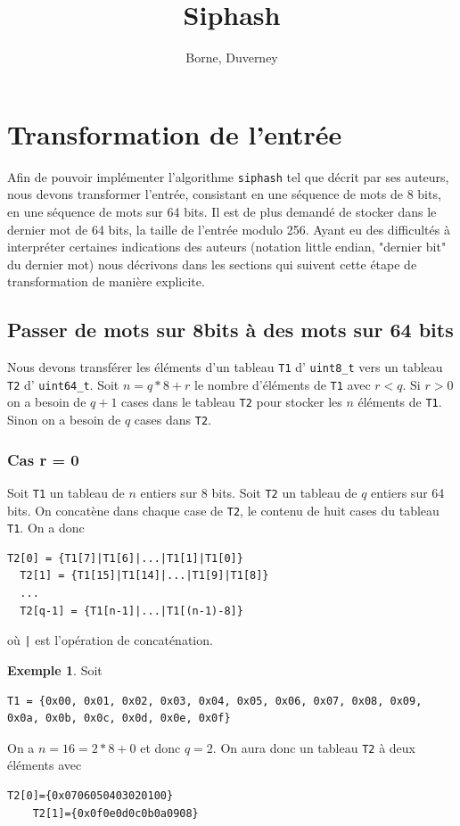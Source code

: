 \documentclass[11pt]{article}
\author{Borne, Duverney}
\date{}
\title{Siphash}
\theoremstyle{definition}
\theoremstyle{definition}
\theoremstyle{definition}
\newtheorem*{myex}{Exemple}
\theoremstyle{theorem}
\theoremstyle{definition}
\begin{document}
\maketitle

\section{Transformation de l'entrée}
Afin de pouvoir implémenter l'algorithme \texttt{siphash} tel que décrit par ses auteurs,
nous devons transformer l'entrée, consistant en une séquence de mots de 8 bits, en une séquence de
mots sur 64 bits. Il est de plus demandé de stocker dans le dernier mot de 64 bits, la taille de l'entrée
modulo 256. Ayant eu des difficultés à interpréter certaines indications des auteurs (notation little endian, "dernier bit" du dernier mot) nous décrivons dans les sections qui suivent cette étape de transformation de manière explicite. 
\subsection{Passer de mots sur 8bits à des mots sur 64 bits}

Nous devons transférer les éléments d'un tableau \texttt{T1} d' \texttt{uint8\_t} vers un tableau \texttt{T2} d' \texttt{uint64\_t}. Soit $n = q*8 + r$ le nombre d'éléments de \texttt{T1} avec $r<q$.
Si $r > 0$ on a besoin de $q+1$ cases dans le tableau \texttt{T2} pour stocker les $n$ éléments de \texttt{T1}.
Sinon on a besoin de $q$ cases dans \texttt{T2}.
\subsubsection{Cas r = 0}
Soit \texttt{T1} un tableau de $n$ entiers sur 8 bits.
Soit \texttt{T2} un tableau de $q$ entiers sur 64 bits.
On concatène dans chaque case de \texttt{T2}, le contenu de huit cases du tableau \texttt{T1}. On a donc
\begin{lstlisting}[basicstyle={\scriptsize\ttfamily}, columns={fixed}, frame={}]
  T2[0] = {T1[7]|T1[6]|...|T1[1]|T1[0]}
  T2[1] = {T1[15]|T1[14]|...|T1[9]|T1[8]}
  ...
  T2[q-1] = {T1[n-1]|...|T1[(n-1)-8]} 
\end{lstlisting}
où \texttt{|} est l'opération de concaténation.
\begin{myex}
  Soit
  \begin{lstlisting}[basicstyle={\scriptsize\ttfamily}, columns={fixed}, frame={}]
    T1 = {0x00, 0x01, 0x02, 0x03, 0x04, 0x05, 0x06, 0x07, 0x08, 0x09, 0x0a, 0x0b, 0x0c, 0x0d, 0x0e, 0x0f}
  \end{lstlisting}
  On a $n = 16 = 2*8 +0$ et donc $q = 2$.
  On aura donc un tableau \texttt{T2} à deux éléments avec
  \begin{lstlisting}[basicstyle={\scriptsize\ttfamily}, columns={fixed}, frame={}]
    T2[0]={0x0706050403020100}
    T2[1]={0x0f0e0d0c0b0a0908}
  \end{lstlisting}
\end{myex}
\end{document}

